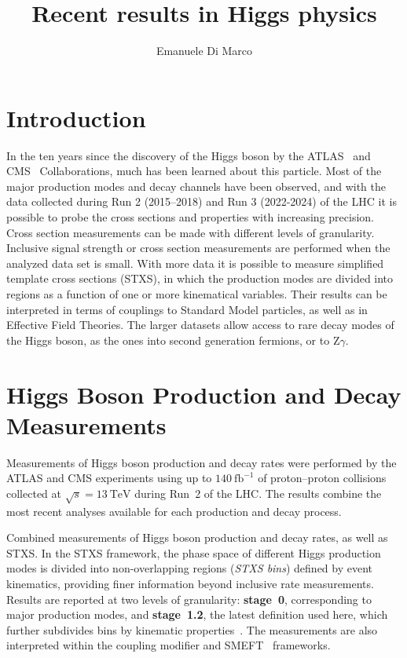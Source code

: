 \documentclass[a4paper,11pt]{article}
\title{Recent results in Higgs physics}
\author*[a]{Emanuele Di Marco}
\affiliation[a]{Istituto Nazionale di Fisica Nucleare (INFN), Sezione di Roma1,\\
  Piazzale Aldo Moro n. 2, 00185, Rome, Italy}
\begin{document}
\maketitle


\section{Introduction}

In the ten years since the discovery of the Higgs boson by the
ATLAS~\cite{ATLAS:2008xda,ATLAS:2012yve} and
CMS~\cite{CMS:2008xjf,CMS:2012qbp,CMS:2013btf} Collaborations, much
has been learned about this particle. Most of the major production
modes and decay channels have been observed, and with the data
collected during Run 2 (2015–2018) and Run 3 (2022-2024) of the LHC it
is possible to probe the cross sections and properties with increasing
precision.  Cross section measurements can be made with diﬀerent
levels of granularity. Inclusive signal strength or cross section
measurements are performed when the analyzed data set is small. With
more data it is possible to measure simplified template cross sections
(STXS), in which the production modes are divided into regions as a
function of one or more kinematical variables. Their results can be
interpreted in terms of couplings to Standard Model particles, as well
as in Effective Field Theories. The larger datasets allow access to
rare decay modes of the Higgs boson, as the ones into second
generation fermions, or to $\textrm{Z}\gamma$.

\section{Higgs Boson Production and Decay Measurements}

Measurements of Higgs boson production and decay rates were performed
by the ATLAS and CMS experiments using up to $140~\text{fb}^{-1}$ of
proton--proton collisions collected at $\sqrt{s} = 13~\text{TeV}$
during Run~2 of the LHC. The results combine the most recent analyses
available for each production and decay process.

Combined measurements of Higgs boson production and
decay rates, as well as STXS. In
the STXS framework, the phase space of different Higgs
production modes is divided into non-overlapping regions (\emph{STXS
bins}) defined by event kinematics, providing finer information beyond
inclusive rate measurements. Results are reported at two levels of
granularity: \textbf{stage~0}, corresponding to major production
modes, and \textbf{stage~1.2}, the latest definition used here, which
further subdivides bins by kinematic properties~\cite{stxs}. The
measurements are also interpreted within the coupling
modifier and \textsc{SMEFT}~\cite{smeft} frameworks.
\end{document}
